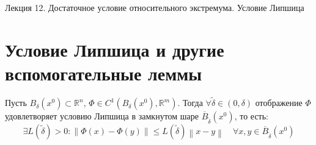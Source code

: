 \documentclass[11pt]{article}
\begin{document}
\begin{titlepage}
    \centering
    \vspace*{\fill}  %

    {\Huge Лекция 12. Достаточное условие относительного экстремума. Условие Липшица
    \par}

    \vspace*{\fill}  %
\end{titlepage}

\setcounter{page}{1}

\section{Условие Липшица и другие вспомогательные леммы}

\begin{lemma}
    Пусть $B_{\delta} (x^0) \subset \mathbb{R}^n$, $\Phi \in C^{1} \left(B_{\delta} (x^0), \mathbb{R}^m \right)$. Тогда $\forall \widetilde{\delta} \in (0, \delta)$ отображение $\Phi$ удовлетворяет условию Липшица в замкнутом шаре $\overline{B}_{\widetilde{\delta}}(x^0)$, то есть:
    \[\exists L(\widetilde{\delta}) > 0: \left\lVert \Phi (x) - \Phi (y) \right\rVert \leq L(\widetilde{\delta}) \left\lVert x - y \right\rVert \quad \forall x, y \in \overline{B}_{\widetilde{\delta}}(x^0)\]
\end{lemma}
\end{document}
